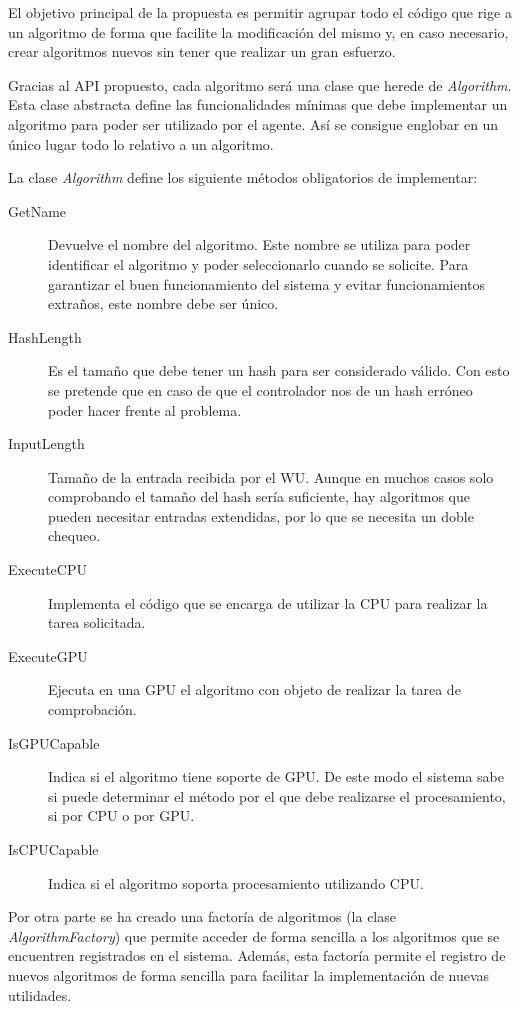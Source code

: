 El objetivo principal de la propuesta es permitir agrupar todo el código que rige a un algoritmo de forma que facilite la modificación del mismo y, en caso necesario, crear algoritmos nuevos sin tener que realizar un gran esfuerzo.

Gracias al API propuesto, cada algoritmo será una clase que herede de \emph{Algorithm}. Esta clase abstracta define las funcionalidades mínimas que debe implementar un algoritmo para poder ser utilizado por el agente. Así se consigue englobar en un único lugar todo lo relativo a un algoritmo.

La clase \emph{Algorithm} define los siguiente métodos obligatorios de implementar:

\begin{description}
	\item[GetName] Devuelve el nombre del algoritmo. Este nombre se utiliza para poder identificar el algoritmo y poder seleccionarlo cuando se solicite. Para garantizar el buen funcionamiento del sistema y evitar funcionamientos extraños, este nombre debe ser único.
	
	\item[HashLength] Es el tamaño que debe tener un hash para ser considerado válido. Con esto se pretende que en caso de que el controlador nos de un hash erróneo poder hacer frente al problema.

	\item[InputLength] Tamaño de la entrada recibida por el WU. Aunque en muchos casos solo comprobando el tamaño del hash sería suficiente, hay algoritmos que pueden necesitar entradas extendidas, por lo que se necesita un doble chequeo.

	\item[ExecuteCPU] Implementa el código que se encarga de utilizar la CPU para realizar la tarea solicitada.

	\item[ExecuteGPU] Ejecuta en una GPU el algoritmo con objeto de realizar la tarea de comprobación.
	
	\item[IsGPUCapable] Indica si el algoritmo tiene soporte de GPU. De este modo el sistema sabe si puede determinar el método por el que debe realizarse el procesamiento, si por CPU o por GPU.
	
	\item[IsCPUCapable] Indica si el algoritmo soporta procesamiento utilizando CPU.
\end{description}

Por otra parte se ha creado una factoría de algoritmos (la clase \emph{AlgorithmFactory}) que permite acceder de forma sencilla a los algoritmos que se encuentren registrados en el sistema. Además, esta factoría permite el registro de nuevos algoritmos de forma sencilla para facilitar la implementación de nuevas utilidades.

